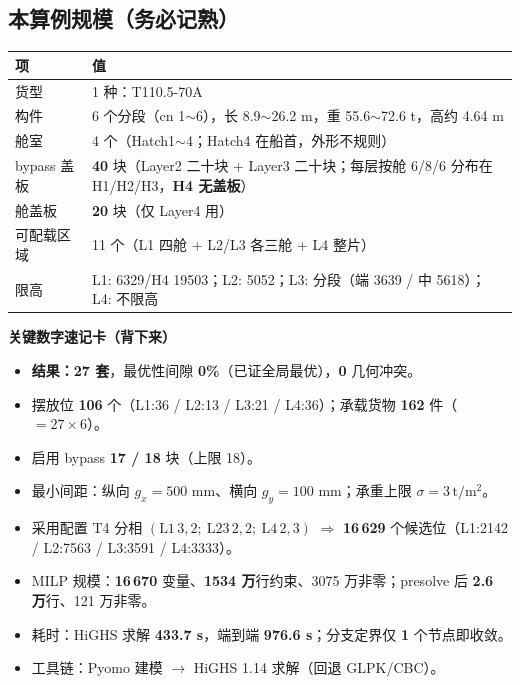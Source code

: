 \documentclass[11pt]{ctexart}
\newcommand{\unit}[1]{\,\mathrm{#1}}
\begin{document}
\subsection{本算例规模（务必记熟）}
\begin{center}\small
\begin{tabular}{ll}
\toprule
项 & 值 \\
\midrule
货型 & 1 种：T110.5-70A \\
构件 & 6 个分段（cn 1$\sim$6），长 8.9$\sim$26.2 m，重 55.6$\sim$72.6 t，高约 4.64 m \\
舱室 & 4 个（Hatch1$\sim$4；Hatch4 在船首，外形不规则）\\
bypass 盖板 & \textbf{40} 块（Layer2 二十块 + Layer3 二十块；每层按舱 6/8/6 分布在 H1/H2/H3，\textbf{H4 无盖板}）\\
舱盖板 & \textbf{20} 块（仅 Layer4 用）\\
可配载区域 & 11 个（L1 四舱 + L2/L3 各三舱 + L4 整片）\\
限高 & L1: 6329/H4 19503；L2: 5052；L3: 分段（端 3639 / 中 5618）；L4: 不限高 \\
\bottomrule
\end{tabular}
\end{center}

\begin{key}\textbf{关键数字速记卡（背下来）}
\begin{itemize}[leftmargin=1.5em,itemsep=1pt]
  \item \textbf{结果：27 套}，最优性间隙 \textbf{0\%}（已证全局最优），\textbf{0} 几何冲突。
  \item 摆放位 \textbf{106} 个（L1:36 / L2:13 / L3:21 / L4:36）；承载货物 \textbf{162} 件（$=27\times6$）。
  \item 启用 bypass \textbf{17 / 18} 块（上限 18）。
  \item 最小间距：纵向 $g_x=500$ mm、横向 $g_y=100$ mm；承重上限 $\sigma=3\unit{t/m^2}$。
  \item 采用配置 T4 分相 $(\text{L1}\,3,2;\ \text{L23}\,2,2;\ \text{L4}\,2,3)$ $\Rightarrow$ \textbf{16\,629} 个候选位（L1:2142 / L2:7563 / L3:3591 / L4:3333）。
  \item MILP 规模：\textbf{16\,670} 变量、\textbf{1534 万}行约束、3075 万非零；presolve 后 \textbf{2.6 万}行、121 万非零。
  \item 耗时：HiGHS 求解 \textbf{433.7 s}，端到端 \textbf{976.6 s}；分支定界仅 \textbf{1} 个节点即收敛。
  \item 工具链：Pyomo 建模 $\to$ HiGHS 1.14 求解（回退 GLPK/CBC）。
\end{itemize}
\end{key}
\end{document}

